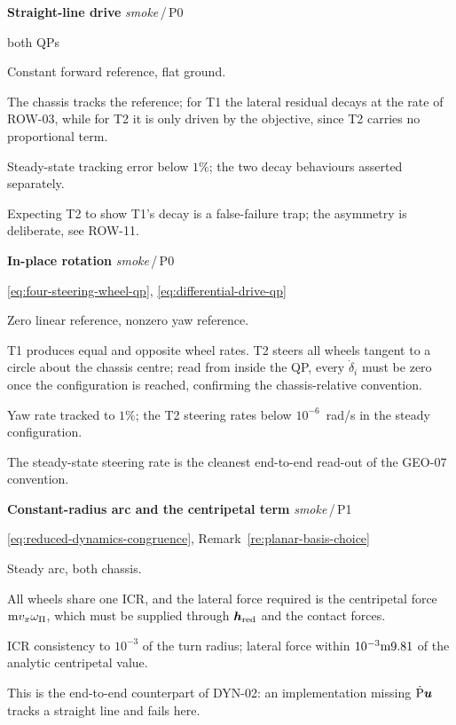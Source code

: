 \documentclass[10pt]{article}
\newenvironment{testcard}[4]{%
  \par\medskip\noindent
  \tBlock{#1}\quad\textbf{#2}%
  \hfill{\small\textit{#3}\,/\,#4}\par\nopagebreak\vspace{2pt}
  \begin{description}[leftmargin=7.5em,style=sameline,itemsep=1pt,topsep=1pt]
}{%
  \end{description}\par\medskip
}
\begin{document}
\begin{testcard}{SMK-03}{Straight-line drive}{smoke}{P0}
  \item[Targets] both QPs
  \item[Regime] Constant forward reference, flat ground.
  \item[Invariant] The chassis tracks the reference; for T1 the lateral
    residual decays at the rate of ROW-03, while for T2 it is only driven by
    the objective, since T2 carries no proportional term.
  \item[Pass] Steady-state tracking error below $1\%$; the two decay behaviours
    asserted separately.
  \item[Diagnosis] Expecting T2 to show T1's decay is a false-failure trap; the
    asymmetry is deliberate, see ROW-11.
\end{testcard}

\begin{testcard}{SMK-04}{In-place rotation}{smoke}{P0}
  \item[Targets] \eqref{eq:four-steering-wheel-qp},
    \eqref{eq:differential-drive-qp}
  \item[Regime] Zero linear reference, nonzero yaw reference.
  \item[Invariant] T1 produces equal and opposite wheel rates. T2 steers all
    wheels tangent to a circle about the chassis centre; read from inside the
    QP, every $\dot\delta_i$ must be zero once the configuration is reached,
    confirming the chassis-relative convention.
  \item[Pass] Yaw rate tracked to $1\%$; the T2 steering rates below
    $10^{-6}$~rad/s in the steady configuration.
  \item[Diagnosis] The steady-state steering rate is the cleanest end-to-end
    read-out of the GEO-07 convention.
\end{testcard}

\begin{testcard}{SMK-05}{Constant-radius arc and the centripetal term}{smoke}{P1}
  \item[Targets] \eqref{eq:reduced-dynamics-congruence},
    Remark~\ref{re:planar-basis-choice}
  \item[Regime] Steady arc, both chassis.
  \item[Invariant] All wheels share one ICR, and the lateral force required is
    the centripetal force $\text{m} v_x\omega_{\Pi}$, which must be supplied
    through $\boldsymbol{h}_{\text{red}}$ and the contact forces.
  \item[Pass] ICR consistency to $10^{-3}$ of the turn radius; lateral force
    within $10^{-3}\mass\gravity[value]$ of the analytic centripetal value.
  \item[Diagnosis] This is the end-to-end counterpart of DYN-02: an
    implementation missing $\dot{\text{P}}\boldsymbol{u}$ tracks a straight line and
    fails here.
\end{testcard}
\end{document}
